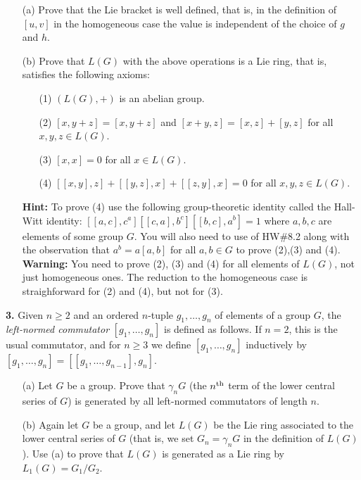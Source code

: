 \documentclass[12pt]{amsart}
\begin{document}
\begin{itemize} 
\item[(a)] Prove that the Lie bracket is well defined, that is, in the definition of $[u,v]$ in the homogeneous case the value is independent of the choice of $g$ and $h$.
\item[(b)] Prove that $L(G)$ with the above operations is a Lie ring, that is, satisfies the following axioms:
\begin{itemize}
\item[(1)] $(L(G),+)$ is an abelian group.
\item[(2)] $[x,y+z]=[x,y+z]$ and $[x+y,z]=[x,z]+[y,z]$ for all $x,y,z\in L(G)$.
\item[(3)] $[x,x]=0$ for all $x\in L(G)$.
\item[(4)] $[[x,y],z]+[[y,z],x]+[[z,y],x]=0$ for all $x,y,z\in L(G)$.
\end{itemize} 
{\bf Hint:} To prove (4) use the following group-theoretic identity called the Hall-Witt identity:
$[[a,c],c^a][[c,a],b^c][[b,c],a^b] = 1$ where $a,b,c$ are elements of some group $G$. You will also need to  use of HW\#8.2 along with the observation that $a^b=a[a,b]$ for all $a,b\in G$ to prove (2),(3) and (4).
\skv
{\bf Warning:} You need to prove (2), (3) and (4) for all elements of $L(G)$, not just homogeneous ones. The reduction to the homogeneous case is straighforward for (2) and (4), but not for (3).

\end{itemize}
\skv
{\bf 3.} Given $n\geq 2$ and an ordered $n$-tuple $g_1,\ldots, g_n$ of elements of a group $G$, the {\it left-normed commutator} $[g_1,\ldots, g_n]$ is defined as follows. If $n=2$, this is the usual commutator,
and for $n\geq 3$ we define $[g_1,\ldots, g_n]$ inductively by $[g_1,\ldots, g_n]=[[g_1,\ldots, g_{n-1}],g_n]$.
\begin{itemize}
\item[(a)] Let $G$ be a group. Prove that $\gamma_n G$ (the $n^{\rm th}$ term of the lower central series of $G$) is generated by all left-normed commutators of length $n$.
\item[(b)] Again let $G$ be a group, and let $L(G)$ be the Lie ring associated to the lower central series of $G$ (that is, we set $G_n=\gamma_n G$ in the definition of $L(G)$). Use (a) to prove that $L(G)$ is generated
as a Lie ring by $L_1(G)=G_1/G_2$.
\end{itemize}
\skv
\end{document}
